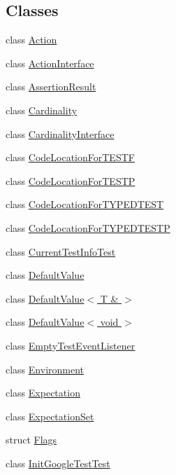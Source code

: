 \subsection*{Classes}
\begin{DoxyCompactItemize}
\item 
class \hyperlink{classtesting_1_1Action}{Action}
\item 
class \hyperlink{classtesting_1_1ActionInterface}{Action\+Interface}
\item 
class \hyperlink{classtesting_1_1AssertionResult}{Assertion\+Result}
\item 
class \hyperlink{classtesting_1_1Cardinality}{Cardinality}
\item 
class \hyperlink{classtesting_1_1CardinalityInterface}{Cardinality\+Interface}
\item 
class \hyperlink{classtesting_1_1CodeLocationForTESTF}{Code\+Location\+For\+T\+E\+S\+TF}
\item 
class \hyperlink{classtesting_1_1CodeLocationForTESTP}{Code\+Location\+For\+T\+E\+S\+TP}
\item 
class \hyperlink{classtesting_1_1CodeLocationForTYPEDTEST}{Code\+Location\+For\+T\+Y\+P\+E\+D\+T\+E\+ST}
\item 
class \hyperlink{classtesting_1_1CodeLocationForTYPEDTESTP}{Code\+Location\+For\+T\+Y\+P\+E\+D\+T\+E\+S\+TP}
\item 
class \hyperlink{classtesting_1_1CurrentTestInfoTest}{Current\+Test\+Info\+Test}
\item 
class \hyperlink{classtesting_1_1DefaultValue}{Default\+Value}
\item 
class \hyperlink{classtesting_1_1DefaultValue_3_01T_01_6_01_4}{Default\+Value$<$ T \& $>$}
\item 
class \hyperlink{classtesting_1_1DefaultValue_3_01void_01_4}{Default\+Value$<$ void $>$}
\item 
class \hyperlink{classtesting_1_1EmptyTestEventListener}{Empty\+Test\+Event\+Listener}
\item 
class \hyperlink{classtesting_1_1Environment}{Environment}
\item 
class \hyperlink{classtesting_1_1Expectation}{Expectation}
\item 
class \hyperlink{classtesting_1_1ExpectationSet}{Expectation\+Set}
\item 
struct \hyperlink{structtesting_1_1Flags}{Flags}
\item 
class \hyperlink{classtesting_1_1InitGoogleTestTest}{Init\+Google\+Test\+Test}
\item 

\end{DoxyCompactItemize}
